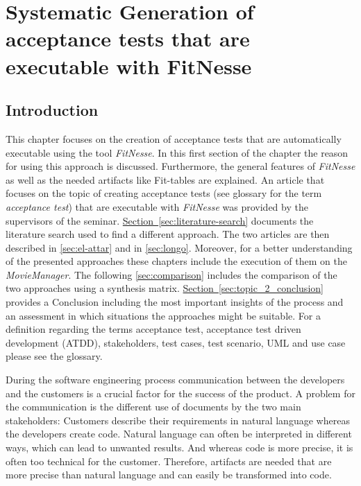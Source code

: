 

\chapter{Systematic Generation of acceptance tests that are executable with FitNesse}
\label{sec:topic_2}

\section{Introduction}\label{sec:topic_2_intro}

This chapter focuses on the creation of acceptance tests that are automatically executable using the tool \textit{FitNesse}.
In this first section of the chapter the reason for using this approach is discussed.
Furthermore, the general features of \textit{FitNesse} as well as the needed artifacts like Fit-tables are explained.
An article that focuses on the topic of creating acceptance tests (see glossary for the term \textit{acceptance test}) that are executable with \textit{FitNesse} was provided by the supervisors of the seminar.
\hyperref[Section]{Section~\ref{sec:literature-search}} documents the literature search used to find a different approach.
The two articles are then described in \autoref{sec:el-attar} and in \autoref{sec:longo}.
Moreover, for a better understanding of the presented approaches these chapters include the execution of them on the \textit{MovieManager}.
The following \autoref{sec:comparison} includes the comparison of the two approaches using a synthesis matrix.
\hyperref[Section]{Section~\ref{sec:topic_2_conclusion}} provides a Conclusion including the most important insights of the process and an assessment in which situations the approaches might be suitable.
For a definition regarding the terms acceptance test, acceptance test driven development (ATDD), stakeholders, test cases, test scenario, UML and use case please see the glossary. 

During the software engineering process communication between the developers and the customers is a crucial factor for the success of the product.
A problem for the communication is the different use of documents by the two main stakeholders:
Customers describe their requirements in natural language whereas the developers create code.
Natural language can often be interpreted in different ways, which can lead to unwanted results.
And whereas code is more precise, it is often too technical for the customer.
Therefore, artifacts are needed that are more precise than natural language and can easily be transformed into code.

